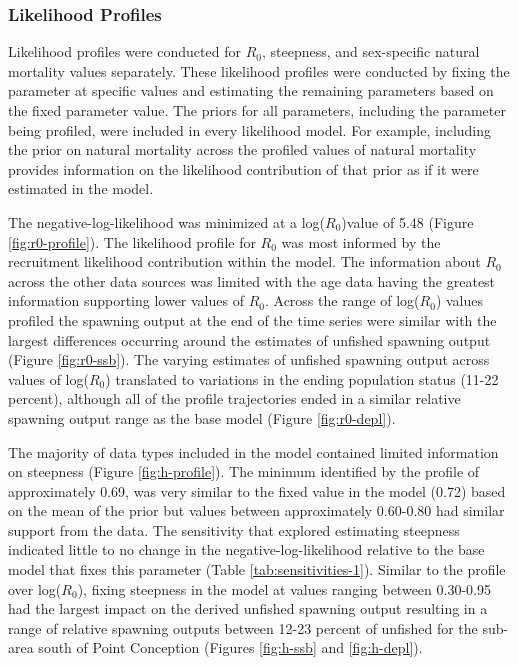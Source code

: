 \documentclass[11pt,
  english,
  letterpaper,
]{article}
\begin{document}
\hypertarget{likelihood-profiles}{%
\subsubsection{Likelihood Profiles}\label{likelihood-profiles}}

Likelihood profiles were conducted for \(R_0\), steepness, and sex-specific natural mortality values separately. These likelihood profiles were conducted by fixing the parameter at specific values and estimating the remaining parameters based on the fixed parameter value. The priors for all parameters, including the parameter being profiled, were included in every likelihood model. For example, including the prior on natural mortality across the profiled values of natural mortality provides information on the likelihood contribution of that prior as if it were estimated in the model.

The negative-log-likelihood was minimized at a log(\(R_0\))value of 5.48 (Figure \ref{fig:r0-profile}). The likelihood profile for \(R_0\) was most informed by the recruitment likelihood contribution within the model. The information about \(R_0\) across the other data sources was limited with the age data having the greatest information supporting lower values of \(R_0\). Across the range of log(\(R_0\)) values profiled the spawning output at the end of the time series were similar with the largest differences occurring around the estimates of unfished spawning output (Figure \ref{fig:r0-ssb}). The varying estimates of unfished spawning output across values of log(\(R_0\)) translated to variations in the ending population status (11-22 percent), although all of the profile trajectories ended in a similar relative spawning output range as the base model (Figure \ref{fig:r0-depl}).

The majority of data types included in the model contained limited information on steepness (Figure \ref{fig:h-profile}). The minimum identified by the profile of approximately 0.69, was very similar to the fixed value in the model (0.72) based on the mean of the prior but values between approximately 0.60-0.80 had similar support from the data. The sensitivity that explored estimating steepness indicated little to no change in the negative-log-likelihood relative to the base model that fixes this parameter (Table \ref{tab:sensitivities-1}). Similar to the profile over log(\(R_0\)), fixing steepness in the model at values ranging between 0.30-0.95 had the largest impact on the derived unfished spawning output resulting in a range of relative spawning outputs between 12-23 percent of unfished for the sub-area south of Point Conception (Figures \ref{fig:h-ssb} and \ref{fig:h-depl}).
\end{document}
